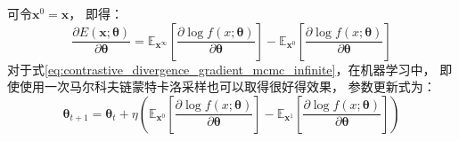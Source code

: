 可令{$\bm{x}^{0}=\bm{x}$}，
即得：
\begin{equation}
    \label{eq:contrastive_divergence_gradient_mcmc_infinite}
    \frac{\partial E(\bm{x};\bm{\theta})}{\partial \bm{\theta}}
    =   \mathbb{E}_{\bm{x}^{\infty}} \left [      \frac{\partial \log  f(x;\bm{\theta}) }{\partial \bm{\theta}}      \right ]   - \mathbb{E}_{\bm{x}^{0}}  \left [ \frac{\partial \log f(x;\bm{\theta})}{\partial \bm{\theta}} \right ]
\end{equation}
对于式{\ref{eq:contrastive_divergence_gradient_mcmc_infinite}}，在机器学习中，
即使使用一次马尔科夫链蒙特卡洛采样也可以取得很好得效果，
参数更新式为：
\begin{equation}
    \bm{\theta}_{t+1}=\bm{\theta}_{t} + \eta \left(  \mathbb{E}_{\bm{x}^{0}} \left [      \frac{\partial \log  f(x;\bm{\theta}) }{\partial \bm{\theta}}      \right ]   - \mathbb{E}_{\bm{x}^{1}}  \left [ \frac{\partial \log f(x;\bm{\theta})}{\partial \bm{\theta}} \right ] \right) 
\end{equation}


